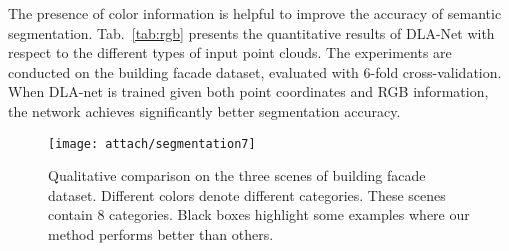 \documentclass[review]{elsarticle}
\begin{document}
The presence of color information is helpful to improve the accuracy of semantic segmentation. Tab.~\ref{tab:rgb} presents the quantitative results of DLA-Net with respect to the different types of input point clouds. The experiments are conducted on the building facade dataset, evaluated with 6-fold cross-validation. When DLA-net is trained given both point coordinates and
RGB information, the network achieves significantly better segmentation accuracy.
\begin{table}[!htbp] \centering \tiny
\end{table}


\begin{figure}[!t]
	\centering \large
	\texttt{[image: attach/segmentation7]}
	\caption{Qualitative comparison on the three scenes of building facade dataset. Different colors denote different categories. These scenes contain 8 categories. Black boxes highlight some examples where our method performs better than others.}
	\label{fig:segmentation}
\end{figure}
\end{document}
